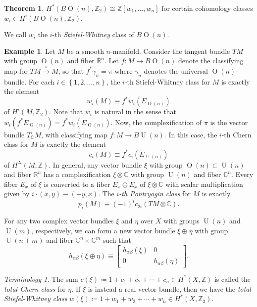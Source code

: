 \documentclass[10pt,letterpaper,cm]{nupset}
\theoremstyle{definition}
\newtheorem{exmp}[defn]{Example}
\theoremstyle{theorem}
\newtheorem{theorem}[defn]{Theorem}
\theoremstyle{remark}
\newtheorem*{term}{Terminology}
\newcommand{\C}{\mathbb C}
\newcommand{\R}{\mathbb{R}}
\newcommand{\Z}{\mathbb Z}
\newcommand{\1}{\mathbb{1}}
\newcommand{\0}{\vec 0}
\DeclareMathOperator{\Or}{O}
\DeclareMathOperator{\Un}{U}
\begin{document}
\begin{theorem}
$H^{\ast}(B{\Or(n)}, \Z_2) \cong \Z\left[w_1, \ldots, w_n\right]$ for certain cohomology classes $w_i \in H^i(B{\Or(n)}, \Z_2)$.
\end{theorem}

We call $w_i$ the $i$-th \textit{Stiefel-Whitney} class of $B{\Or(n)}$.


\begin{exmp}
Let $M$ be a smooth $n$-manifold. Consider the tangent bundle $T{M}$ with group $\Or(n)$ and fiber $\R^n$. Let $f : M \to B{\Or(n)}$ denote the classifying map for $T{M} \overset{\pi}{\longrightarrow} M$, so that  $f^{\ast}{\gamma_n} = \pi$ where $\gamma_n$ denotes the universal $\Or(n)$-bundle. For each $i\in \left\{1, 2, \ldots, n\right\}$, the $i$-th Stiefel-Whitney class for $M$ is exactly the element 
\[
w_i(M) \equiv f^{\ast}{w_i\left(E_{\Or(n)}\right)}
\] of $H^i(M, \Z_2)$. Note that $w_i$ is natural in the sense that  
$w_i\left(f^{\ast}{E_{\Or(n)}}\right) =  f^{\ast}{w_i\left(E_{\Or(n)}\right)}$.  Now, the complexification of $\pi$ is the vector bundle $T_{\C}{M}$, with classifying map $f: M \to B{\Un(n)}$. In this case, the
$i$-th Chern class for $M$ is exactly the element
\[
c_i(M) \equiv f^{\ast}{c_i\left(E_{\Un(n)}\right)}
\] of $H^{2i}(M, \Z)$.
 In general, any  vector bundle $\xi$ with group $\Or(n) \subset \Un(n)$ and fiber $\R^n$ has a complexification $\xi \otimes \C$ with group $\Un(n)$ and fiber $\C^n$. Every fiber $E_x$ of $\xi$ is converted to a fiber $E_x \oplus E_x$ of $\xi \otimes \C$ with scalar multiplication given by $i \cdot \left(x,y\right) \equiv \left({-y}, x\right)$. The \textit{$i$-th Pontryagin class} for $M$ is exactly
\[
p_i(M) \equiv \left({-1}\right)^ic_{2i}(T{M} \otimes \C).
\]
\end{exmp}

\medskip

For any two complex vector bundles $\xi$ and $ \eta$ over $X$ with groups $\Un(n)$ and $\Un(m)$, respectively, we can form a new vector bundle $\xi \oplus \eta$ with group $\Un(n +m)$ and fiber $\C^n \times \C^m$ such that
\[
h_{\alpha{\beta}}(\xi \oplus \eta) \equiv \begin{bmatrix}  h_{\alpha{\beta}}(\xi) & 0 \\ 0 & h_{\alpha{\beta}}(\eta) \end{bmatrix}.
\]

\begin{term} 
The sum $c(\xi) \coloneqq 1 + c_1 + c_2 + \cdots + c_n \in H^{\ast}(X, \Z)$ is called the \textit{total Chern class} for $\eta$. If $\xi$ is instead a real vector bundle, then we have the \textit{total Stiefel-Whitney class} $w(\xi) \coloneqq 1 + w_1 + w_2 + \cdots + w_n \in H^{\ast}(X, \Z_2)$.
\end{term}
\end{document}
